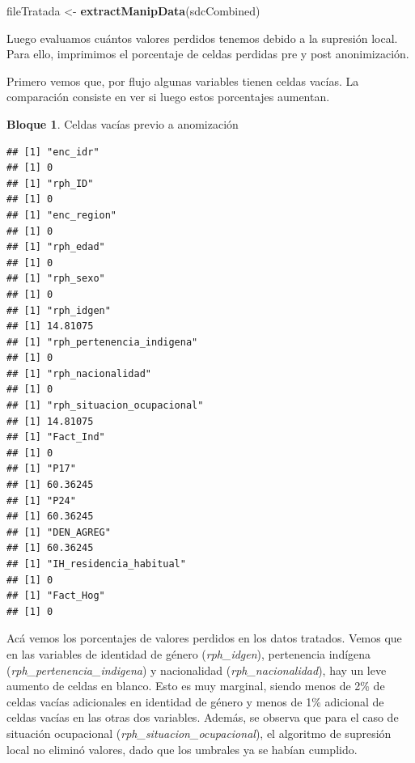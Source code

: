 \documentclass[]{book}
\newenvironment{Shaded}{\begin{snugshade}}{\end{snugshade}}
\newcommand{\CommentTok}[1]{\textcolor[rgb]{0.56,0.35,0.01}{\textit{#1}}}
\newcommand{\ControlFlowTok}[1]{\textcolor[rgb]{0.13,0.29,0.53}{\textbf{#1}}}
\newcommand{\DecValTok}[1]{\textcolor[rgb]{0.00,0.00,0.81}{#1}}
\newcommand{\KeywordTok}[1]{\textcolor[rgb]{0.13,0.29,0.53}{\textbf{#1}}}
\newcommand{\NormalTok}[1]{#1}
\newcommand{\OperatorTok}[1]{\textcolor[rgb]{0.81,0.36,0.00}{\textbf{#1}}}
\newcommand{\StringTok}[1]{\textcolor[rgb]{0.31,0.60,0.02}{#1}}
\theoremstyle{definition}
\theoremstyle{definition}
\newtheorem{example}{Bloque}[chapter]
\theoremstyle{definition}
\theoremstyle{definition}
\theoremstyle{remark}
\begin{document}
\begin{Shaded}
\begin{Highlighting}[]
\NormalTok{fileTratada <-}\StringTok{ }\KeywordTok{extractManipData}\NormalTok{(sdcCombined)}
\end{Highlighting}
\end{Shaded}

Luego evaluamos cuántos valores perdidos tenemos debido a la supresión local. Para ello, imprimimos el porcentaje de celdas perdidas pre y post anonimización.

Primero vemos que, por flujo algunas variables tienen celdas vacías. La comparación consiste en ver si luego estos porcentajes aumentan.

\begin{example}
\protect\hypertarget{exm:bloque71nbm}{}{\label{exm:bloque71nbm} }Celdas vacías previo a anomización
\end{example}

\begin{Shaded}
\end{Shaded}

\begin{verbatim}
## [1] "enc_idr"
## [1] 0
## [1] "rph_ID"
## [1] 0
## [1] "enc_region"
## [1] 0
## [1] "rph_edad"
## [1] 0
## [1] "rph_sexo"
## [1] 0
## [1] "rph_idgen"
## [1] 14.81075
## [1] "rph_pertenencia_indigena"
## [1] 0
## [1] "rph_nacionalidad"
## [1] 0
## [1] "rph_situacion_ocupacional"
## [1] 14.81075
## [1] "Fact_Ind"
## [1] 0
## [1] "P17"
## [1] 60.36245
## [1] "P24"
## [1] 60.36245
## [1] "DEN_AGREG"
## [1] 60.36245
## [1] "IH_residencia_habitual"
## [1] 0
## [1] "Fact_Hog"
## [1] 0
\end{verbatim}

Acá vemos los porcentajes de valores perdidos en los datos tratados. Vemos que en las variables de identidad de género (\emph{rph\_idgen}), pertenencia indígena (\emph{rph\_pertenencia\_indigena}) y nacionalidad (\emph{rph\_nacionalidad}), hay un leve aumento de celdas en blanco. Esto es muy marginal, siendo menos de 2\% de celdas vacías adicionales en identidad de género y menos de 1\% adicional de celdas vacías en las otras dos variables. Además, se observa que para el caso de situación ocupacional (\emph{rph\_situacion\_ocupacional}), el algoritmo de supresión local no eliminó valores, dado que los umbrales ya se habían cumplido.
\end{document}
